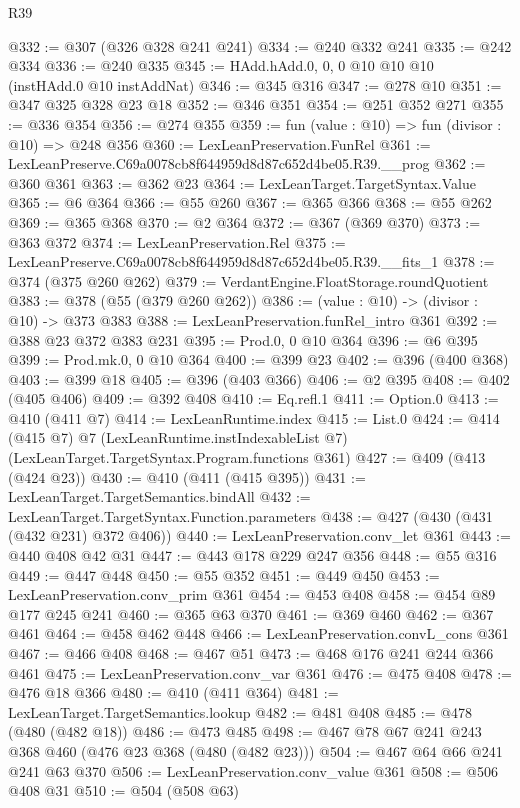 \begin{lexlean}{R39}
\begin{coremodule}
@332 := @307 (@326 @328 @241 @241)
@334 := @240 @332 @241
@335 := @242 @334
@336 := @240 @335
@345 := HAdd.hAdd.{0, 0, 0} @10 @10 @10 (instHAdd.{0} @10 instAddNat)
@346 := @345 @316
@347 := @278 @10
@351 := @347 @325 @328 @23 @18
@352 := @346 @351
@354 := @251 @352 @271
@355 := @336 @354
@356 := @274 @355
@359 := fun (value : @10) => fun (divisor : @10) => @248 @356
@360 := LexLeanPreservation.FunRel
@361 := LexLeanPreserve.C69a0078cb8f644959d8d87c652d4be05.R39.__prog
@362 := @360 @361
@363 := @362 @23
@364 := LexLeanTarget.TargetSyntax.Value
@365 := @6 @364
@366 := @55 @260
@367 := @365 @366
@368 := @55 @262
@369 := @365 @368
@370 := @2 @364
@372 := @367 (@369 @370)
@373 := @363 @372
@374 := LexLeanPreservation.Rel
@375 := LexLeanPreserve.C69a0078cb8f644959d8d87c652d4be05.R39.__fits_1
@378 := @374 (@375 @260 @262)
@379 := VerdantEngine.FloatStorage.roundQuotient
@383 := @378 (@55 (@379 @260 @262))
@386 := (value : @10) -> (divisor : @10) -> @373 @383
@388 := LexLeanPreservation.funRel_intro @361
@392 := @388 @23 @372 @383 @231
@395 := Prod.{0, 0} @10 @364
@396 := @6 @395
@399 := Prod.mk.{0, 0} @10 @364
@400 := @399 @23
@402 := @396 (@400 @368)
@403 := @399 @18
@405 := @396 (@403 @366)
@406 := @2 @395
@408 := @402 (@405 @406)
@409 := @392 @408
@410 := Eq.refl.{1}
@411 := Option.{0}
@413 := @410 (@411 @7)
@414 := LexLeanRuntime.index
@415 := List.{0}
@424 := @414
    (@415 @7)
    @7
    (LexLeanRuntime.instIndexableList @7)
    (LexLeanTarget.TargetSyntax.Program.functions @361)
@427 := @409 (@413 (@424 @23))
@430 := @410 (@411 (@415 @395))
@431 := LexLeanTarget.TargetSemantics.bindAll
@432 := LexLeanTarget.TargetSyntax.Function.parameters
@438 := @427 (@430 (@431 (@432 @231) @372 @406))
@440 := LexLeanPreservation.conv_let @361
@443 := @440 @408 @42 @31
@447 := @443 @178 @229 @247 @356
@448 := @55 @316
@449 := @447 @448
@450 := @55 @352
@451 := @449 @450
@453 := LexLeanPreservation.conv_prim @361
@454 := @453 @408
@458 := @454 @89 @177 @245 @241
@460 := @365 @63 @370
@461 := @369 @460
@462 := @367 @461
@464 := @458 @462 @448
@466 := LexLeanPreservation.convL_cons @361
@467 := @466 @408
@468 := @467 @51
@473 := @468 @176 @241 @244 @366 @461
@475 := LexLeanPreservation.conv_var @361
@476 := @475 @408
@478 := @476 @18 @366
@480 := @410 (@411 @364)
@481 := LexLeanTarget.TargetSemantics.lookup
@482 := @481 @408
@485 := @478 (@480 (@482 @18))
@486 := @473 @485
@498 := @467 @78 @67 @241 @243 @368 @460 (@476 @23 @368 (@480 (@482 @23)))
@504 := @467 @64 @66 @241 @241 @63 @370
@506 := LexLeanPreservation.conv_value @361
@508 := @506 @408 @31
@510 := @504 (@508 @63)

\end{coremodule}
\end{lexlean}
